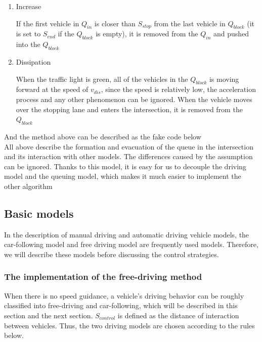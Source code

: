\documentclass[a4paper]{paper}
\begin{document}
\begin{enumerate}
\item Increase

If the first vehicle in $Q_{in}$ is closer than $S_{stop}$ from the last vehicle in $Q_{block}$ (it is set to $S_{end}$ if the $Q_{block}$ is empty), it is removed from the $Q_{in}$ and pushed into the $Q_{block}$

\item Dissipation

When the traffic light is green, all of the vehicles in the $Q_{block}$ is moving forward at the speed of $v_{dis}$, since the speed is relatively low, the acceleration process and any other phenomenon can be ignored. When the vehicle moves over the stopping lane and enters the intersection, it is removed from the $Q_{block}$
\end{enumerate}
And the method above can be described as the fake code below\\



All above describe the formation and evacuation of the queue in the intersection and its interaction with other models. The differences caused by the assumption can be ignored. Thanks to this model, it is easy for us to decouple the driving model and the queuing model, which makes it much easier to implement the other algorithm
\subsection{Basic models}
In the description of manual driving and automatic driving vehicle models, the car-following model and free driving model are frequently used models. Therefore, we will describe these models before discussing the control strategies.

\subsubsection{The implementation of the free-driving method}

When there is no speed guidance, a vehicle's driving behavior can be roughly classified into free-driving and car-following, which will be described in this section and the next section. $S_{control}$ is defined as the distance of interaction between vehicles. Thus, the two driving models are chosen according to the rules below.
\end{document}
